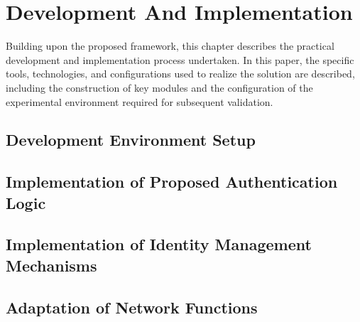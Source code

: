 \chapter{Development And Implementation}%
\label{chapter:development-and-implementation}

\begin{introduction}
Building upon the proposed framework, this chapter describes the practical development and implementation process undertaken. In this paper, the specific tools, technologies, and configurations used to realize the solution are described, including the construction of key modules and the configuration of the experimental environment required for subsequent validation.
\end{introduction}

\section{Development Environment Setup}



\section{Implementation of Proposed Authentication Logic}



\section{Implementation of Identity Management Mechanisms}


\section{Adaptation of Network Functions}

